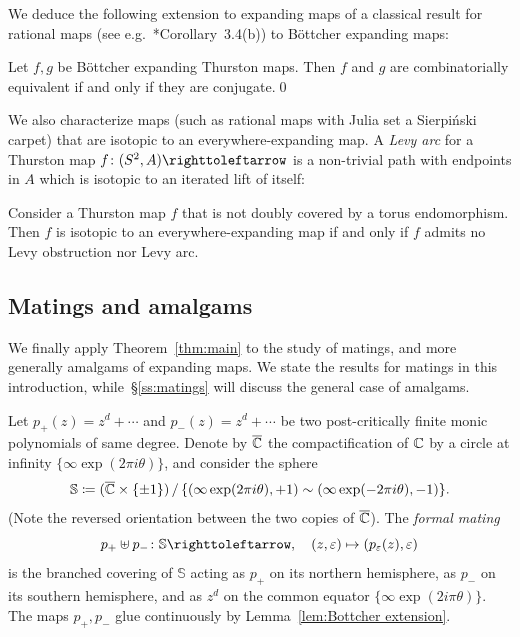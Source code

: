 \documentclass{amsart}
\begin{document}
We deduce the following extension to expanding maps of a classical
result for rational maps (see
e.g.~\cite{douady-h:thurston}*{Corollary~3.4(b)}) to B\"ottcher
expanding maps:
\begin{cor}[=Lemma~\ref{lem:ConjBetwExpMaps}]
  Let $f,g$ be B\"ottcher expanding Thurston maps. Then $f$ and $g$
  are combinatorially equivalent if and only if they are conjugate.\qed
\end{cor}

We also characterize maps (such as rational maps with Julia set a
Sierpi\'nski carpet) that are isotopic to an everywhere-expanding
map. A \emph{Levy arc} for a Thurston map $f\colon(S^2,A)\selfmap$ is
a non-trivial path with endpoints in $A$ which is isotopic to an
iterated lift of itself:
\begin{prop}[= Lemma~\ref{lem:HomIsolCond} with $A=A'$]
  Consider a Thurston map $f$ that is not doubly covered by a torus
  endomorphism. Then $f$ is isotopic to an everywhere-expanding map if
  and only if $f$ admits no Levy obstruction nor Levy arc.
\end{prop}

\subsection{Matings and amalgams}
We finally apply Theorem~\ref{thm:main} to the study of matings, and
more generally amalgams of expanding maps. We state the results for
matings in this introduction, while~\S\ref{ss:matings} will discuss
the general case of amalgams.

Let $p_+(z)=z^d+\cdots$ and $p_-(z)=z^d+\cdots$ be two post-critically
finite monic polynomials of same degree. Denote by $\overline{{\mathbb C}}$ the
compactification of ${\mathbb C}$ by a circle at infinity
$\{\infty\exp(2\pi i\theta)\}$, and consider the sphere
\[\mathbb S\coloneqq (\overline{{\mathbb C}}\times\{\pm1\})\,/\,\{(\infty\exp(2\pi i\theta),+1)\sim(\infty\exp(-2\pi i\theta),-1)\}.\]
(Note the reversed orientation between the two copies of
$\overline{{\mathbb C}}$). The \emph{formal mating}
\begin{equation}\label{eq:mating}
  p_+ \FM p_-\colon \mathbb S\selfmap,\quad (z,\varepsilon)\mapsto(p_\varepsilon(z),\varepsilon)
\end{equation}
is the branched covering of $\mathbb S$ acting as $p_+$ on its
northern hemisphere, as $p_-$ on its southern hemisphere, and as $z^d$
on the common equator $\{\infty\exp(2i\pi\theta)\}$. The maps
$p_+,p_-$ glue continuously by Lemma~\ref{lem:Bottcher extension}.
\end{document}
